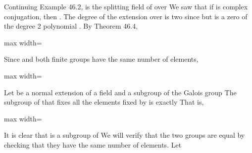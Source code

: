 \documentclass[11pt,oneside]{article}
\begin{document}
\begin{BookBody}

 Continuing Example 46.2,  is the splitting field of  over  We saw that if \BookInline{\sigma } is complex conjugation, then . The degree of the extension  over  is two since  but \BookInline{\alpha } is a zero of the degree 2 polynomial . By Theorem 46.4,

\begin{center}\begin{adjustbox}{max width=\linewidth}\end{adjustbox}\end{center}

Since  and both finite groups have the same number of elements,

\begin{center}\begin{adjustbox}{max width=\linewidth}\end{adjustbox}\end{center} \BookEnd{\blacktriangle}

 Let  be a normal extension of a field  and  a subgroup of the Galois group  The subgroup of  that fixes all the elements fixed by  is exactly  That is,

\begin{center}\begin{adjustbox}{max width=\linewidth}\end{adjustbox}\end{center}

 It is clear that  is a subgroup of  We will verify that the two groups are equal by checking that they have the same number of elements. Let 


\end{BookBody}
\end{document}
